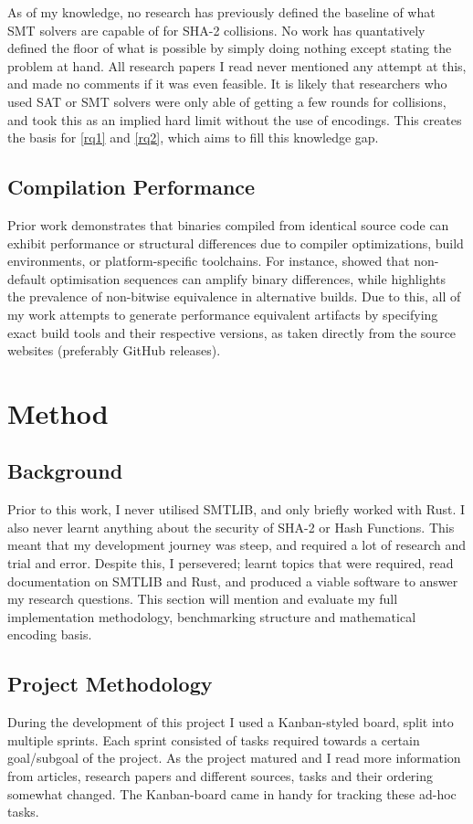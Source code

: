 \documentclass[a4paper]{report}
\begin{document}
As of my knowledge, no research has previously defined the baseline of what SMT solvers are capable of for SHA-2 collisions.
No work has quantatively defined the floor of what is possible by simply doing nothing except stating the problem at hand.
All research papers I read never mentioned any attempt at this, and made no comments if it was even feasible.
It is likely that researchers who used SAT or SMT solvers were only able of getting a few rounds for collisions,
and took this as an implied hard limit without the use of encodings.
This creates the basis for \ref{rq1} and \ref{rq2}, which aims to fill this knowledge gap.

\pagebreak
\section{Compilation Performance}
\label{sec:compilation-performance}
Prior work demonstrates that binaries compiled from identical source code can exhibit performance or
structural differences due to compiler optimizations, build environments, or platform-specific toolchains.
For instance, \cite{ren_2021} showed that non-default optimisation sequences can amplify binary differences,
while \cite{dietrich_2024} highlights the prevalence of non-bitwise equivalence in alternative builds.
Due to this, all of my work attempts to generate performance equivalent artifacts by specifying exact build tools and their respective versions, as taken directly from the source websites (preferably GitHub releases).


\chapter{Method}
\section{Background}
Prior to this work, I never utilised SMTLIB, and only briefly worked with Rust.
I also never learnt anything about the security of SHA-2 or Hash Functions.
This meant that my development journey was steep, and required a lot of research and trial and error.
Despite this, I persevered; learnt topics that were required, read documentation on SMTLIB and Rust, and produced a viable software to answer my research questions.
This section will mention and evaluate my full implementation methodology, benchmarking structure and mathematical encoding basis.

\section{Project Methodology}
During the development of this project I used a Kanban-styled board, split into multiple sprints.
Each sprint consisted of tasks required towards a certain goal/subgoal of the project.
As the project matured and I read more information from articles, research papers and different sources, tasks and their ordering somewhat changed.
The Kanban-board came in handy for tracking these ad-hoc tasks.
\end{document}
